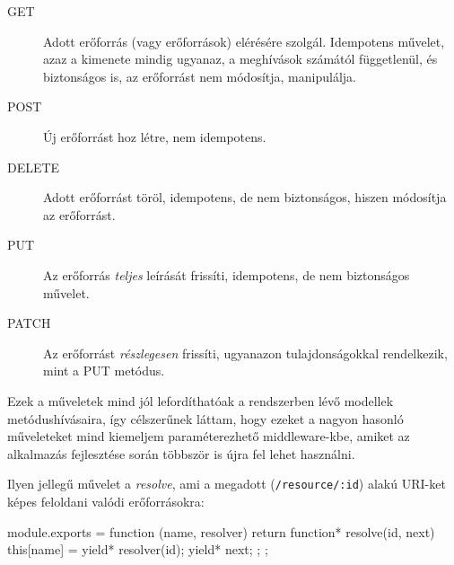 \begin{description}
  \item[GET] Adott erőforrás (vagy erőforrások) elérésére szolgál.
    Idempotens művelet, azaz a kimenete mindig ugyanaz, a meghívások számától
    függetlenül, és biztonságos is, az erőforrást nem módosítja, manipulálja.
  \item[POST] Új erőforrást hoz létre, nem idempotens.
  \item[DELETE] Adott erőforrást töröl, idempotens, de nem biztonságos, hiszen
    módosítja az erőforrást.
  \item[PUT] Az erőforrás \emph{teljes} leírását frissíti, idempotens, de nem
    biztonságos művelet.
  \item[PATCH] Az erőforrást \emph{részlegesen} frissíti, ugyanazon
    tulajdonságokkal rendelkezik, mint a PUT metódus.
\end{description}

Ezek a műveletek mind jól lefordíthatóak a rendszerben lévő modellek
metódushívásaira, így célszerűnek láttam, hogy ezeket a nagyon hasonló
műveleteket mind kiemeljem paraméterezhető middleware-kbe, amiket az alkalmazás
fejlesztése során többször is újra fel lehet használni.

Ilyen jellegű művelet a \emph{resolve}, ami a megadott (\verb=/resource/:id=)
alakú URI-ket képes feloldani valódi erőforrásokra:

\begin{js}
module.exports = function (name, resolver) {
  return function* resolve(id, next) {
    this[name] = yield* resolver(id);
    yield* next;
  };
};
\end{js}
